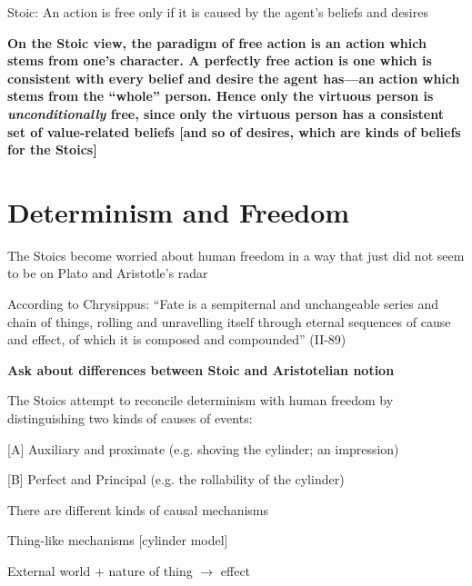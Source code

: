 \documentclass[11pt]{article}
\begin{document}
Stoic: An action is free only if it is caused by the agent's beliefs and desires
\vspace*{2mm}

\noindent\textbf{On the Stoic view, the paradigm of free action is an action which stems from one's character. A perfectly free action is one which is consistent with every belief and desire the agent has---an action which stems from the ``whole'' person. Hence only the virtuous person is \emph{unconditionally} free, since only the virtuous person has a consistent set of value-related beliefs [and so of desires, which are kinds of beliefs for the Stoics]}
\vspace*{-3mm}

\section*{Determinism and Freedom}

\noindent The Stoics become worried about human freedom in a way that just did not seem to be on Plato and Aristotle's radar
\vspace*{2mm}

\noindent According to Chrysippus: ``Fate is a sempiternal and unchangeable series and chain of things, rolling and unravelling itself through eternal sequences of cause and effect, of which it is composed and compounded'' (II-89)
\vspace*{2mm}

\noindent\textbf{Ask about differences between Stoic and Aristotelian notion}

\noindent The Stoics attempt to reconcile determinism with human freedom by distinguishing two kinds of causes of events:
\vspace*{2mm}

[A] Auxiliary and proximate (e.g. shoving the cylinder; an impression)
\vspace{1mm}

[B] Perfect and Principal (e.g. the rollability of the cylinder)
\vspace*{2mm}

\noindent There are different kinds of causal mechanisms
\vspace*{2mm}

Thing-like mechanisms [cylinder model]
\vspace*{1mm}

\hspace*{5mm} External world + nature of thing $\rightarrow$ effect
\vspace*{1mm}
\end{document}
